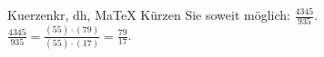\begin{MAufgabe}{Kuerzen}{kr, dh, MaTeX}
K\"urzen Sie soweit m\"oglich: $\frac{4345}{935}$.\\ 
\ifLsg\MLoesung
\quad $\frac{4345}{935}=\frac{(55)\cdot(79)}{(55)\cdot(17)}=\frac{79}{17}$.\else\relax\fi
 \end{MAufgabe}